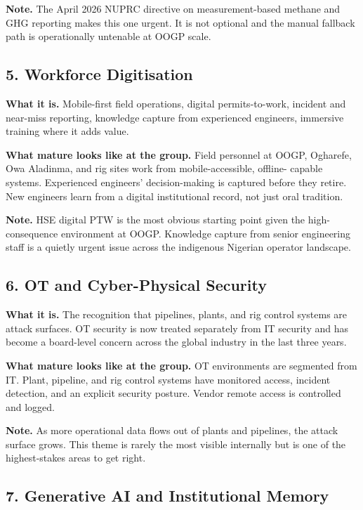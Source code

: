 \documentclass[10pt]{article}
\newcommand{\spacer}{\vspace{10pt}}
\begin{document}
\textbf{Note.} The April 2026 NUPRC directive on measurement-based methane
and GHG reporting makes this one urgent. It is not optional and the manual
fallback path is operationally untenable at OOGP scale.

\spacer

\subsection*{5. Workforce Digitisation}

\textbf{What it is.} Mobile-first field operations, digital permits-to-work,
incident and near-miss reporting, knowledge capture from experienced
engineers, immersive training where it adds value.

\textbf{What mature looks like at the group.} Field personnel at OOGP,
Ogharefe, Owa Aladinma, and rig sites work from mobile-accessible, offline-
capable systems. Experienced engineers' decision-making is captured before
they retire. New engineers learn from a digital institutional record, not
just oral tradition.

\textbf{Note.} HSE digital PTW is the most obvious starting point given the
high-consequence environment at OOGP. Knowledge capture from senior
engineering staff is a quietly urgent issue across the indigenous Nigerian
operator landscape.

\spacer

\subsection*{6. OT and Cyber-Physical Security}

\textbf{What it is.} The recognition that pipelines, plants, and rig control
systems are attack surfaces. OT security is now treated separately from IT
security and has become a board-level concern across the global industry in
the last three years.

\textbf{What mature looks like at the group.} OT environments are segmented
from IT. Plant, pipeline, and rig control systems have monitored access,
incident detection, and an explicit security posture. Vendor remote access is
controlled and logged.

\textbf{Note.} As more operational data flows out of plants and pipelines,
the attack surface grows. This theme is rarely the most visible internally
but is one of the highest-stakes areas to get right.

\spacer

\subsection*{7. Generative AI and Institutional Memory}
\end{document}
